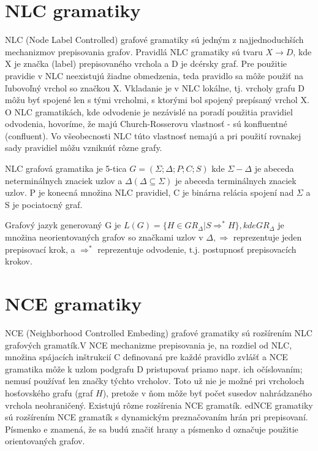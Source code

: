 \section{NLC gramatiky}
NLC (Node Label Controlled) grafové gramatiky sú jedným 
z najjednoduchších mechanizmov prepisovania grafov. Pravidlá NLC gramatiky 
sú tvaru $X \to D$, kde X je značka (label) prepisovaného vrchola a D je 
dcérsky graf. Pre použitie pravidie v NLC neexistujú žiadne obmedzenia, teda 
pravidlo sa môže použiť na ľubovoľný vrchol so značkou X.
Vkladanie je v NLC lokálne, tj. vrcholy grafu D môžu byť spojené len s tými 
vrcholmi, s ktorými bol spojený prepísaný vrchol X.
O NLC gramatikách, kde odvodenie je nezávislé na poradí použitia pravidiel 
odvodenia, hovoríme, že majú Church-Rosserovu vlastnosť 
- sú konfluentné (confluent). 
Vo všeobecnosti NLC túto vlastnosť nemajú a pri použití rovnakej sady 
pravidiel môžu vzniknúť rôzne grafy. 

\begin{defin}
NLC grafová gramatika je 5-tica $G = (\Sigma ;\Delta ; P;C; S)$ kde
$\Sigma  - \Delta$  je abeceda neterminálnych znaciek uzlov a
 $\Delta  (\Delta  \subseteq  \Sigma )$ je abeceda
terminálnych znaciek uzlov. P je konecná množina NLC pravidiel, C je
binárna relácia spojení nad $\Sigma$  a S je pociatocný graf.
\end{defin}

\begin{defin}
Grafový jazyk generovaný G je $L(G) = \{H \in GR_\Delta  | S \Rightarrow ^*H\}
, kde GR_\Delta $  je množina neorientovaných grafov so značkami uzlov 
v $\Delta ,\Rightarrow $  reprezentuje jeden prepisovací krok, 
a $\Rightarrow ^* $ reprezentuje odvodenie, t.j. postupnosť prepisovacích 
krokov.
\end{defin}

\section{NCE gramatiky}
NCE (Neighborhood Controlled Embeding) grafové gramatiky sú rozšírením NLC 
grafových gramatík.V NCE mechanizme prepisovania je, 
na rozdiel od NLC, množina spájacích inštrukcií C definovaná 
pre každé pravidlo zvlášť a NCE gramatika môže k uzlom podgrafu D 
pristupovať priamo napr. ich očíslovaním; nemusí používať len značky týchto
vrcholov. Toto už nie je možné pri vrcholoch hosťovského grafu (graf $H$),
pretože v ňom môže byť počet susedov nahrádzaného vrchola neohraničený.
Existujú rôzne rozšírenia NCE gramatík.
edNCE gramatiky sú rozšírením NCE gramatík s dynamickým 
preznačovaním hrán pri prepisovaní. 
Písmenko e znamená, že sa  budú značiť hrany a písmenko d označuje 
použitie orientovaných grafov.

